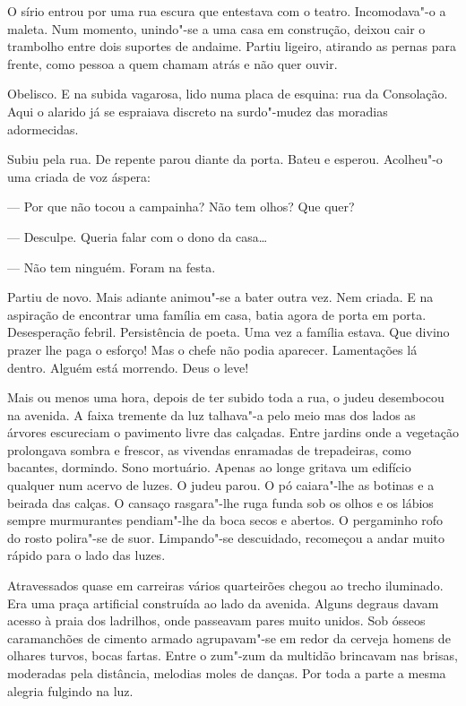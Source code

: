 O sírio entrou por uma rua escura que entestava com o teatro.
Incomodava"-o a maleta. Num momento, unindo"-se a uma casa em construção,
deixou cair o trambolho entre dois suportes de andaime. Partiu ligeiro,
atirando as pernas para frente, como pessoa a quem chamam atrás e não
quer ouvir.

Obelisco. E na subida vagarosa, lido numa placa de esquina: rua da
Consolação. Aqui o alarido já se espraiava discreto na surdo"-mudez das
moradias adormecidas.

Subiu pela rua. De repente parou diante da porta. Bateu e esperou.
Acolheu"-o uma criada de voz áspera:

--- Por que não tocou a campainha? Não tem olhos? Que quer?

--- Desculpe. Queria falar com o dono da casa\ldots{}

--- Não tem ninguém. Foram na festa.

Partiu de novo. Mais adiante animou"-se a bater outra vez. Nem criada. E
na aspiração de encontrar uma família em casa, batia agora de porta em
porta. Desesperação febril. Persistência de poeta. Uma vez a família
estava. Que divino prazer lhe paga o esforço! Mas o chefe não podia
aparecer. Lamentações lá dentro. Alguém está morrendo. Deus o leve!

Mais ou menos uma hora, depois de ter subido toda a rua, o judeu
desembocou na avenida. A faixa tremente da luz talhava"-a pelo meio mas
dos lados as árvores escureciam o pavimento livre das calçadas. Entre
jardins onde a vegetação prolongava sombra e frescor, as vivendas
enramadas de trepadeiras, como bacantes, dormindo. Sono mortuário.
Apenas ao longe gritava um edifício qualquer num acervo de luzes. O
judeu parou. O pó caiara"-lhe as botinas e a beirada das calças. O
cansaço rasgara"-lhe ruga funda sob os olhos e os lábios sempre
murmurantes pendiam"-lhe da boca secos e abertos. O pergaminho rofo do
rosto polira"-se de suor. Limpando"-se descuidado, recomeçou a andar muito
rápido para o lado das luzes.

Atravessados quase em carreiras vários quarteirões chegou ao trecho
iluminado. Era uma praça artificial construída ao lado da avenida.
Alguns degraus davam acesso à praia dos ladrilhos, onde passeavam pares
muito unidos. Sob ósseos caramanchões de cimento armado agrupavam"-se em
redor da cerveja homens de olhares turvos, bocas fartas. Entre o zum"-zum
da multidão brincavam nas brisas, moderadas pela distância, melodias
moles de danças. Por toda a parte a mesma alegria fulgindo na luz.


